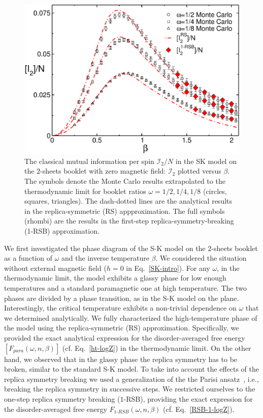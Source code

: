 \documentclass[twocolumn,superscriptaddress,prb,10pt]{revtex4-1}
\begin{document}
\begin{figure}[t]
\includegraphics*[width=0.93\linewidth]{./draft_figs/I2_extrapolated}
\caption{ The classical mutual information per spin ${\mathcal I}_2/N$ 
 in the SK model on the $2$-sheets booklet with zero magnetic field: 
 ${\mathcal I}_2$ plotted versus $\beta$. The symbols denote the 
 Monte Carlo results extrapolated to the thermodynamic limit for 
 booklet ratios $\omega=1/2,1/4,1/8$ (circles, squares, triangles). 
 The dash-dotted lines are the analytical results in the 
 replica-symmetric (RS) appproximation. The full symbols (rhombi) 
 are the results in the first-step replica-symmetry-breaking (1-RSB) 
 approximation.
}
\label{I2-extrapolated}
\end{figure}


We first investigated the phase diagram of the S-K model on the $2$-sheets booklet as a 
function of $\omega$ and the inverse temperature $\beta$. We considered the situation 
without external magnetic field ($h=0$ in Eq.~\eqref{SK-intro}). For any $\omega$, in the 
thermodynamic limit, the model exhibits a glassy phase for low enough temperatures and 
a standard paramagnetic one at high temperature. The two phases are divided 
by a phase transition, as in the S-K model on the plane. Interestingly, the critical 
temperature exhibits a non-trivial dependence on $\omega$ that we determined analytically. 
We fully characterized the high-temperature phase of the model using the replica-symmetric 
(RS) approximation. Specifically, we provided the exact analytical expression for the 
disorder-averaged free energy $[F_{para}(\omega,n,\beta)]$  (cf. Eq.~\eqref{ht-logZ}) in 
the thermodynamic limit. On the other hand, we observed that in the glassy phase the 
replica symmetry has to be broken, similar to the standard S-K model. To take into account 
the effects of the replica symmetry breaking we used a generalization of the the Parisi 
ansatz~\cite{parisi-1980}, i.e., breaking the replica symmetry in successive 
steps. We restricted ourselves to the one-step replica symmetry breaking ($1$-RSB),   
providing the exact expression for the disorder-averaged free energy $F_{1\textrm{-}RSB}
(\omega,n,\beta)$ (cf. Eq.~\eqref{RSB-1-logZ}). 
\end{document}
